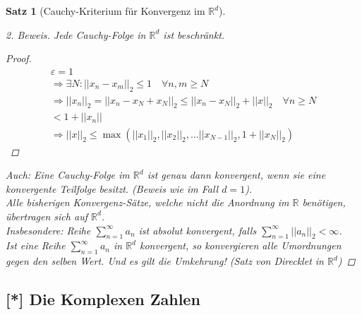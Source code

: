 \documentclass[11pt, twoside, a4paper]{article}
\theoremstyle{plain}
\newtheorem{satz}[blockelement]{Satz}
\newcommand{\pair}[1]{\left(#1\right)}
\newcommand{\abs}[1]{\left|#1\right|}
\newcommand{\norm}[1]{\abs{\abs{#1}}}
\newcommand{\impl}[0]{\Rightarrow{}}
\newcommand{\R}{\mathbb{R}}
\begin{document}
\begin{satz}[Cauchy-Kriterium für Konvergenz im $\R^d$]
\begin{proof}[2. Beweis]
            Jede Cauchy-Folge in $\R^d$ ist beschränkt.
            \begin{proof}
                \begin{align*}
                    \varepsilon = 1\\
                    \impl \exists N\colon\norm{x_n-x_m}_2 \leq 1\quad\forall n,m\geq N\\
                    \impl \norm{x_n}_2 = \norm{x_n-x_N+x_N}_2 \leq \norm{x_n-x_N}_2 + \norm{x}_2\quad\forall n\geq N\\
                    < 1 + \norm{x_n}\\
                    \impl \norm{x}_2 \leq \max\pair{\norm{x_1}_2, \norm{x_2}_2,\dots\norm{x_{N-1}}_2, 1+\norm{x_N}_2}
                \end{align*}
            \end{proof}
            Auch: Eine Cauchy-Folge im $\R^d$ ist genau dann konvergent, wenn sie eine konvergente Teilfolge besitzt. (Beweis wie im Fall $d=1$).\\
            Alle bisherigen Konvergenz-Sätze, welche nicht die Anordnung im $\R$ benötigen, übertragen sich auf $\R^d$.\\
            Insbesondere: Reihe $\sum_{n=1}^{\infty} a_n$ ist absolut konvergent, falls $\sum_{n=1}^{\infty} \norm{a_n}_2 < \infty$.\\
            Ist eine Reihe $\sum_{n=1}^{\infty} a_n$ in $\R^d$ konvergent, so konvergieren alle Umordnungen gegen den selben Wert. Und es gilt die Umkehrung! (Satz von Direcklet in $\R^d$)
        \end{proof}
    \end{satz}

    \subsection{[*] Die Komplexen Zahlen}
\end{document}
